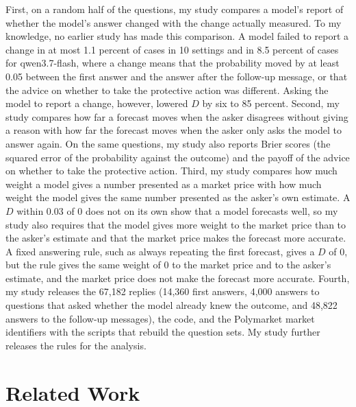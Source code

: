 \documentclass[11pt]{article}
\begin{document}
First, on a random half of the questions, my study compares a model's report of whether the model's answer changed with the change actually measured. To my knowledge, no earlier study has made this comparison. A model failed to report a change in at most 1.1 percent of cases in 10 settings and in 8.5 percent of cases for qwen3.7-flash, where a change means that the probability moved by at least 0.05 between the first answer and the answer after the follow-up message, or that the advice on whether to take the protective action was different. Asking the model to report a change, however, lowered $D$ by six to 85 percent. Second, my study compares how far a forecast moves when the asker disagrees without giving a reason with how far the forecast moves when the asker only asks the model to answer again. On the same questions, my study also reports Brier scores (the squared error of the probability against the outcome) and the payoff of the advice on whether to take the protective action. Third, my study compares how much weight a model gives a number presented as a market price with how much weight the model gives the same number presented as the asker's own estimate. A $D$ within 0.03 of 0 does not on its own show that a model forecasts well, so my study also requires that the model gives more weight to the market price than to the asker's estimate and that the market price makes the forecast more accurate. A fixed answering rule, such as always repeating the first forecast, gives a $D$ of 0, but the rule gives the same weight of 0 to the market price and to the asker's estimate, and the market price does not make the forecast more accurate. Fourth, my study releases the 67,182 replies (14,360 first answers, 4,000 answers to questions that asked whether the model already knew the outcome, and 48,822 answers to the follow-up messages), the code, and the Polymarket market identifiers with the scripts that rebuild the question sets. My study further releases the rules for the analysis.

\section{Related Work}
\label{sec:related}
\end{document}
